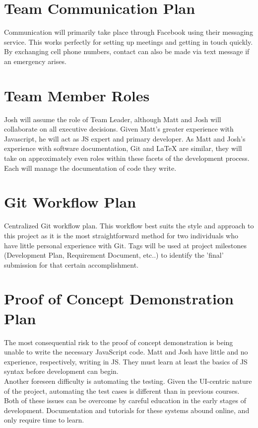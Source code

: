 \documentclass{article}
\begin{document}
	\section{Team Communication Plan}
	
	Communication will primarily take place through Facebook using their 
	messaging service. This 
	works perfectly for setting up meetings and getting in touch quickly. By exchanging 
	cell phone numbers, contact can also be made via text message if an 
	emergency arises. 
	
	\section{Team Member Roles}
	Josh will assume the role of Team Leader, although Matt and Josh will 
	collaborate on all executive 
	decisions. Given Matt's greater experience with Javascript, he will act as 
	JS expert and primary developer. As Matt and Josh's experience with 
	software 
	documentation, Git and LaTeX are similar, they will take on approximately 
	even roles within these facets of the development process. Each will manage 
	the documentation of code they write. 
	\section{Git Workflow Plan}
	
	Centralized Git workflow plan. This workflow best suits the style 
	and approach to this project as it is the most straightforward method for 
	two individuals 
	who have little personal experience with Git. Tags will be used at project
	milestones (Development Plan, Requirement Document, etc..) to identify the 
	'final'	submission for that certain accomplishment. 
	
	\section{Proof of Concept Demonstration Plan}
	The most consequential risk to the proof of concept demonstration is being 
	unable to write the necessary JavaScript code. Matt and Josh have 
	little and no experience, respectively, writing in JS. They must learn at 
	least the basics of JS syntax before development can begin.\\
	Another foreseen difficulty is automating the testing. Given the UI-centric 
	nature of the project, automating the test cases is different than in 
	previous courses.\\
	Both of these issues can be overcome by careful education in the early 
	stages of development. Documentation and tutorials for these systems abound 
	online, and only require time to learn.
\end{document}
